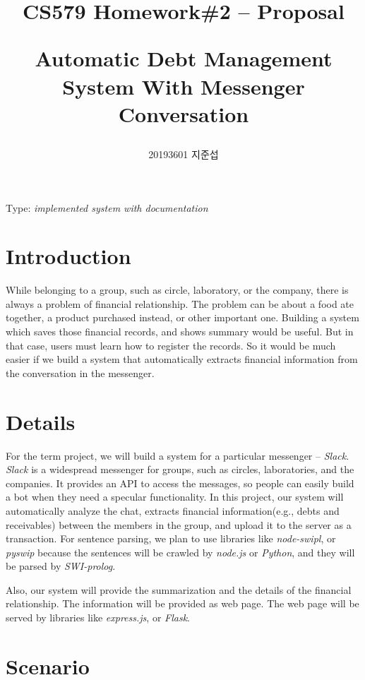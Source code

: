 \documentclass[11pt]{article}
\author{20193601 지준섭}
\title{CS579 Homework\#2 -- Proposal \\
\begin{large}
  Automatic Debt Management System With Messenger Conversation
\end{large}}
\begin{document}
\maketitle

Type: \textit{implemented system with documentation}

\section{Introduction}

While belonging to a group, such as circle, laboratory, or the company,
there is always a problem of financial relationship.
The problem can be about a food ate together, a product purchased instead,
or other important one.
Building a system which saves those financial records, and shows summary
would be useful.
But in that case, users must learn how to register the records.
So it would be much easier if we build a system that automatically
extracts financial information from the conversation in the messenger.

\section{Details}

For the term project, we will build a system for a particular messenger
-- \textit{Slack}.
\textit{Slack} is a widespread messenger for groups,
such as circles, laboratories, and the companies.
It provides an API to access the messages,
so people can easily build a bot when they need a specular functionality.
In this project, our system will automatically analyze the chat,
extracts financial information(e.g., debts and receivables)
between the members in the group, and upload it to the server as a transaction.
For sentence parsing, we plan to use libraries like
\textit{node-swipl}, or \textit{pyswip}
because the sentences will be crawled by \textit{node.js} or \textit{Python},
and they will be parsed by \textit{SWI-prolog}.


Also, our system will provide the summarization and the details
of the financial relationship.
The information will be provided as web page.
The web page will be served by libraries like
\textit{express.js}, or \textit{Flask}.

\section{Scenario}
\end{document}
